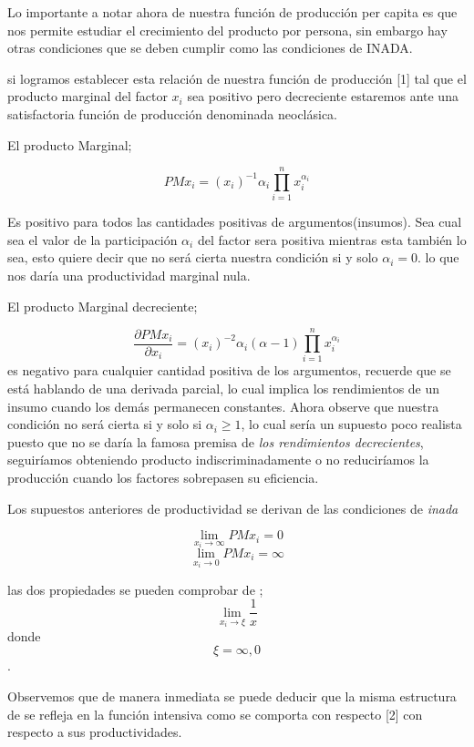 \documentclass[12pt]{article}
\begin{document}
Lo importante a notar ahora de nuestra función de producción per capita es que nos permite estudiar el crecimiento del producto por persona, sin embargo hay otras condiciones que se deben cumplir como las condiciones de INADA.

si logramos establecer esta relación de nuestra función de producción [1] tal que el producto marginal del factor $x_{i}$ sea positivo pero decreciente estaremos ante una satisfactoria función de producción denominada neoclásica.


El producto Marginal; 

$$PMx_i=(x_i)^{-1}\alpha_i\prod_{i=1}^nx_i^{\alpha_i}$$

Es positivo para todos las cantidades positivas de argumentos(insumos). Sea cual sea el valor de la participación $\alpha_i$ del factor sera positiva mientras esta también lo sea, esto quiere decir que no será cierta nuestra condición si y solo $\alpha_{i}=0$. lo que nos daría una productividad marginal nula.


El producto Marginal decreciente;

$$\frac{\partial PMx_i}{\partial x_i}=(x_i)^{-2}\alpha_i(\alpha - 1)\prod_{i=1}^nx_i^{\alpha_i}$$
es negativo para cualquier cantidad positiva de los argumentos, recuerde que se está hablando de una derivada parcial, lo cual implica los rendimientos de un insumo cuando los demás permanecen constantes. Ahora observe que nuestra condición no será cierta si y solo si $\alpha_i \geq 1$, lo cual sería un supuesto poco realista puesto que no se daría la famosa premisa de \textit{los rendimientos decrecientes}, seguiríamos obteniendo producto indiscriminadamente o no reduciríamos la producción cuando los factores sobrepasen su eficiencia.





Los supuestos anteriores de productividad se derivan de las condiciones de \textit{inada}

$$\lim_{x_i\longrightarrow \infty}PMx_i=0$$
$$\lim_{x_i\longrightarrow 0}PMx_i=\infty$$

\newpage
las dos propiedades se pueden comprobar de ;
$$\lim_{x_i\longrightarrow \xi}\frac{1}{x}$$ donde $$ {\xi=\infty, 0}$$.



Observemos que de manera inmediata se puede deducir que la misma estructura de se refleja en la función intensiva como se comporta con respecto [2] con respecto a sus productividades.
\end{document}
